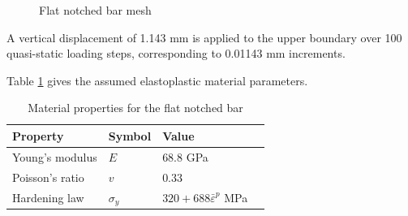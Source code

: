 \documentclass[sn-mathphys,Numbered,draft]{sn-jnl}%
\begin{document}
\begin{figure}[htbp]
	\centering
		
		
		\caption{Flat notched bar mesh}
	\label{fig:flat_bar_mesh}
\end{figure}

A vertical displacement of 1.143 \si{\milli\meter} is applied to the upper boundary over 100 quasi-static loading steps, corresponding to 0.01143 \si{\milli\meter} increments.

Table \ref{tab:flat_bar_mat} gives the assumed elastoplastic material parameters.
\begin{table}[htb]
	\centering
		\begin{tabular}{llll} \hline
			Property & Symbol & Value  \\ \hline 
			Young's modulus & $E$ & $68.8$ GPa \\
			Poisson's ratio & $v$ & $0.33$   \\
			Hardening law & $\sigma_y$ & $320+688\bar{\varepsilon}^p$ MPa  \\
			\hline
		\end{tabular}
	\caption{Material properties for the flat notched bar}
	\label{tab:flat_bar_mat}
\end{table}
\end{document}
